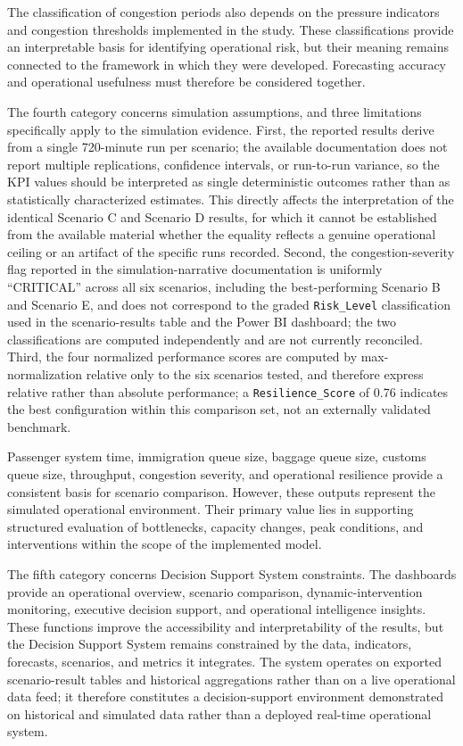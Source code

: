 The classification of congestion periods also depends on the pressure indicators and congestion thresholds implemented in the study. These classifications provide an interpretable basis for identifying operational risk, but their meaning remains connected to the framework in which they were developed. Forecasting accuracy and operational usefulness must therefore be considered together.

The fourth category concerns simulation assumptions, and three limitations specifically apply to the simulation evidence. First, the reported results derive from a single 720-minute run per scenario; the available documentation does not report multiple replications, confidence intervals, or run-to-run variance, so the KPI values should be interpreted as single deterministic outcomes rather than as statistically characterized estimates. This directly affects the interpretation of the identical Scenario C and Scenario D results, for which it cannot be established from the available material whether the equality reflects a genuine operational ceiling or an artifact of the specific runs recorded. Second, the congestion-severity flag reported in the simulation-narrative documentation is uniformly ``CRITICAL'' across all six scenarios, including the best-performing Scenario B and Scenario E, and does not correspond to the graded \nolinkurl{Risk_Level} classification used in the scenario-results table and the Power BI dashboard; the two classifications are computed independently and are not currently reconciled. Third, the four normalized performance scores are computed by max-normalization relative only to the six scenarios tested, and therefore express relative rather than absolute performance; a \nolinkurl{Resilience_Score} of 0.76 indicates the best configuration within this comparison set, not an externally validated benchmark.

Passenger system time, immigration queue size, baggage queue size, customs queue size, throughput, congestion severity, and operational resilience provide a consistent basis for scenario comparison. However, these outputs represent the simulated operational environment. Their primary value lies in supporting structured evaluation of bottlenecks, capacity changes, peak conditions, and interventions within the scope of the implemented model.

The fifth category concerns Decision Support System constraints. The dashboards provide an operational overview, scenario comparison, dynamic-intervention monitoring, executive decision support, and operational intelligence insights. These functions improve the accessibility and interpretability of the results, but the Decision Support System remains constrained by the data, indicators, forecasts, scenarios, and metrics it integrates. The system operates on exported scenario-result tables and historical aggregations rather than on a live operational data feed; it therefore constitutes a decision-support environment demonstrated on historical and simulated data rather than a deployed real-time operational system.

